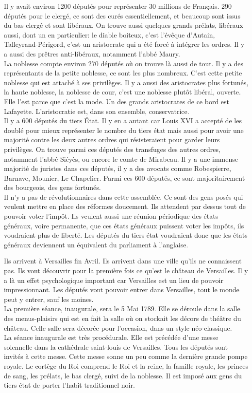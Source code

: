 \documentclass[10pt, a4paper, openany]{book}
\begin{document}
Il y avait environ 1200 députés pour représenter 30 millions de Français. 290 députés pour le clergé, ce sont des curés essentiellement, et beaucoup sont issus du bas clergé et sont libéraux. On trouve aussi quelques grands prélats, libéraux aussi, dont un en particulier: le diable boiteux, c'est l'évêque d'Autain, Talleyrand-Périgord, c'est un aristocrate qui a été forcé à intégrer les ordres. Il y a aussi des prêtres anti-libéraux, notamment l'abbé Maury. \\
La noblesse compte environ 270 députés où on trouve là aussi de tout. Il y a des représentants de la petite noblesse, ce sont les plus nombreux. C'est cette petite noblesse qui est attaché à ses privilèges. Il y a aussi des aristocrates plus fortunés, la haute noblesse, la noblesse de cour, c'est une noblesse plutôt libéral, ouverte. Elle l'est parce que c'est la mode. Un des grands aristocrates de ce bord est Lafayette. L'aristocratie est, dans son ensemble, conservatrice. \\
Il y a 600 députés du tiers État. Il y en a autant car Louis XVI a accepté de les doublé pour mieux représenter le nombre du tiers état mais aussi pour avoir une majorité contre les deux autres ordres qui résisteraient pour garder leurs privilèges. On trouve parmi ces députés des transfuges des autres ordres, notamment l'abbé Siéyès, ou encore le comte de Mirabeau. Il y a une immense majorité de juristes dans ces députés, il y a des avocats comme Robespierre, Barnave, Mounier, Le Chapelier. Parmi ces 600 députés, ce sont majoritairement des bourgeois, des gens fortunés. \\
Il n'y a pas de révolutionnaires dans cette assemblée. Ce sont des gens posés qui veulent mettre en place des réformes doucement. Ils attendent par dessus tout de pouvoir voter l'impôt. Ils veulent aussi une réunion périodique des états généraux, voire permanente, que ces états généraux puissent voter les impôts, ils voudraient plus de liberté. Les députés du tiers état voudraient donc que les états généraux deviennent un équivalent du parliament à l'anglaise.


Ils arrivent à Versailles fin Avril. Ils arrivent dans une ville qu'ils ne connaissent pas. Ils vont découvrir pour la première fois ce qu'est le château de Versailles. Il y a là un effet psychologique important car Versailles est un lieu de pouvoir impressionnant. Les députés vont pouvoir entrer dans Versailles, tout le monde peut y entrer, sauf les moines. \\
La première séance, inaugurale, sera le 5 Mai 1789. Elle se déroule dans la salle des menus-plaisirs qui est en fait la salle où on stockait les décors de théâtre du château. Celle salle sera décorée pour l'occasion, dans un style néo-classique. \\
La séance inaugurale est très procédurale. Elle est précédée d'une messe solennelle dans la cathédrale saint-louis de Versailles. Tous les députés sont invités à cette messe. Cette messe sonne un peu comme la dernière grande pompe royale. Le cortège du Roi comprend le Roi et la reine, la famille royale, les princes de sang, les prélats, le bas clergé, suivi de la noblesse. Il est imposé aux gens du tiers état de porter l'habit traditionnel noir.
\end{document}
